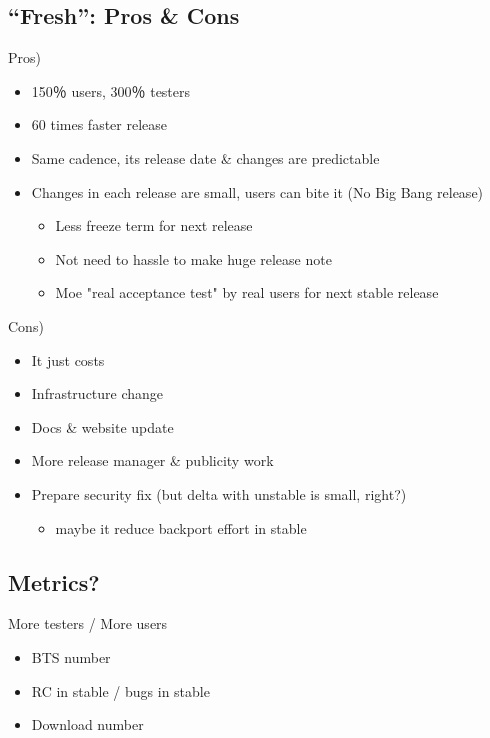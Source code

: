\documentclass[mingoth,a4paper]{jsarticle}
\begin{document}
\subsection{“Fresh”: Pros \& Cons}
\noindent
Pros)
\begin{itemize}
 \item 150％ users, 300％ testers
 \item 60 times faster release
 \item Same cadence, its release date \& changes are predictable
 \item Changes in each release are small, users can bite it (No Big Bang release)
  \begin{itemize}
   \item Less freeze term for next release
   \item Not need to hassle to make huge release note
   \item Moe "real acceptance test" by real users for next stable release
  \end{itemize}
\end{itemize}
Cons)
\begin{itemize}
 \item It just costs
 \item Infrastructure change
 \item Docs \& website update
 \item More release manager \& publicity work
 \item Prepare security fix (but delta with unstable is small, right?)
  \begin{itemize}
   \item maybe it reduce backport effort in stable
  \end{itemize}
\end{itemize}
\subsection{Metrics?}
\noindent
More testers / More users
\begin{itemize}
 \item BTS number
 \item RC in stable / bugs in stable
 \item Download number
\end{itemize}

\end{document}
